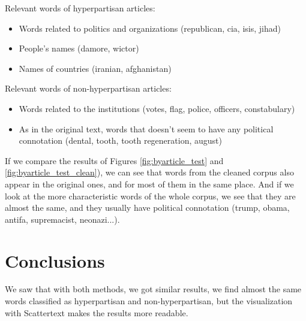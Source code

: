 \documentclass[11pt,a4paper]{article}
\begin{document}
Relevant words of hyperpartisan articles:

\begin{itemize}
    \item Words related to politics and organizations (republican, cia, isis, jihad)
    \item People's names (damore, wictor) 
    \item Names of countries (iranian, afghanistan)
\end{itemize}


Relevant words of non-hyperpartisan articles:

\begin{itemize}
    \item Words related to the institutions (votes, flag, police, officers, constabulary)
    \item As in the original text, words that doesn't seem to have any political connotation (dental, tooth, tooth regeneration, august)
\end{itemize}

If we compare the results of Figures \ref{fig:byarticle_test} and \ref{fig:byarticle_test_clean}), we can see that words from the cleaned corpus also appear in the original ones, and for most of them in the same place. And if we look at the more characteristic words of the whole corpus, we see that they are almost the same, and they usually have political connotation (trump, obama, antifa, supremacist, neonazi...).

\section{Conclusions}

We saw that with both methods, we got similar results, we find almost the same words classified as hyperpartisan and non-hyperpartisan, but the visualization with Scattertext makes the results more readable. 



\end{document}
